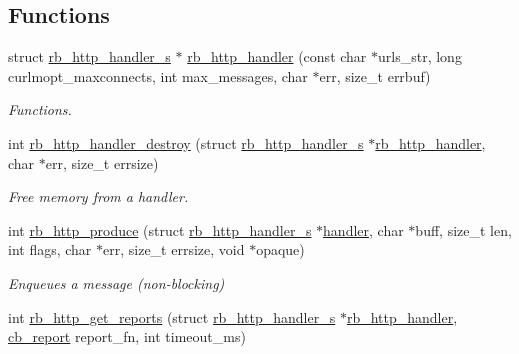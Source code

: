 \subsection*{Functions}
\begin{DoxyCompactItemize}
\item 
struct \hyperlink{structrb__http__handler__s}{rb\-\_\-http\-\_\-handler\-\_\-s} $\ast$ \hyperlink{librb-http_8h_a190d674d1d8cac12e0dd2445c5c8cba4}{rb\-\_\-http\-\_\-handler} (const char $\ast$urls\-\_\-str, long curlmopt\-\_\-maxconnects, int max\-\_\-messages, char $\ast$err, size\-\_\-t errbuf)
\begin{DoxyCompactList}\small\item\em Functions. \end{DoxyCompactList}\item 
int \hyperlink{librb-http_8h_aea4aa423ff2034b027817632c746fd39}{rb\-\_\-http\-\_\-handler\-\_\-destroy} (struct \hyperlink{structrb__http__handler__s}{rb\-\_\-http\-\_\-handler\-\_\-s} $\ast$\hyperlink{rb__http__handler_8c_a68c2a5bd671ddb123e3f38057b5c45f6}{rb\-\_\-http\-\_\-handler}, char $\ast$err, size\-\_\-t errsize)
\begin{DoxyCompactList}\small\item\em Free memory from a handler. \end{DoxyCompactList}\item 
int \hyperlink{librb-http_8h_a0d0d31d9c2dc9ed04d6722e5653b4682}{rb\-\_\-http\-\_\-produce} (struct \hyperlink{structrb__http__handler__s}{rb\-\_\-http\-\_\-handler\-\_\-s} $\ast$\hyperlink{rb__http__handler__example_8c_a0165697b451a136ac74647662a5a39e1}{handler}, char $\ast$buff, size\-\_\-t len, int flags, char $\ast$err, size\-\_\-t errsize, void $\ast$opaque)
\begin{DoxyCompactList}\small\item\em Enqueues a message (non-\/blocking) \end{DoxyCompactList}\item 
int \hyperlink{librb-http_8h_a890e981b619b1bdd5cc37fa16bb06f06}{rb\-\_\-http\-\_\-get\-\_\-reports} (struct \hyperlink{structrb__http__handler__s}{rb\-\_\-http\-\_\-handler\-\_\-s} $\ast$\hyperlink{rb__http__handler_8c_a68c2a5bd671ddb123e3f38057b5c45f6}{rb\-\_\-http\-\_\-handler}, \hyperlink{librb-http_8h_abcf27caf85ec3ac2b11d1b89aed63966}{cb\-\_\-report} report\-\_\-fn, int timeout\-\_\-ms)
\end{DoxyCompactItemize}


